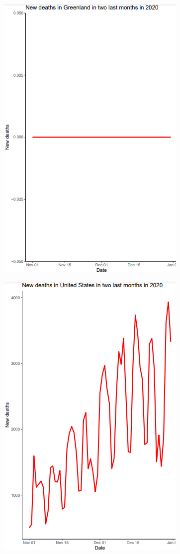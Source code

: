 \documentclass[a4paper]{article}
\theoremstyle{definition}
\begin{document}
\begin{enumerate}[i)]
\begin{enumerate}[1]
\begin{figure}[H]
			\end{figure}
			\begin{figure}[H]
				\centering
				\includegraphics[scale=0.8]{images/5.5.2.png}
			\end{figure}
			\begin{figure}[H]
				\centering
				\includegraphics[scale=0.8]{images/5.5.3.png}

\end{figure}
\end{enumerate}
\end{enumerate}
\end{document}
